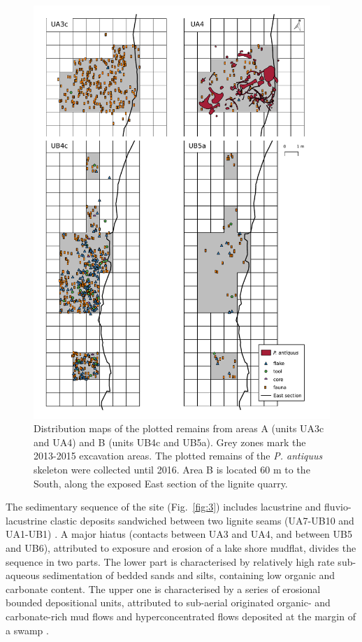 \documentclass[preprint,authoryear,times]{elsarticle} %
\begin{document}
\begin{figure}[]
  \centering
  \includegraphics[width=.9\textwidth]{./artwork/Fig2.pdf}
  \caption{Distribution maps of the plotted remains from areas A (units UA3c and UA4) and B (units UB4c and UB5a). Grey zones mark the 2013-2015 excavation areas. The plotted remains of the \emph{P. antiquus} skeleton were collected until 2016. Area B is located 60 m to the South, along the exposed East section of the lignite quarry.}
  \label{fig:2}
\end{figure}

The sedimentary sequence of the site (Fig.~\ref{fig:3}) includes lacustrine and fluvio-lacustrine clastic deposits sandwiched between two lignite seams (UA7-UB10 and UA1-UB1) \citep{Karkanas}. A major hiatus (contacts between UA3 and UA4, and between UB5 and UB6), attributed to exposure and erosion of a lake shore mudflat, divides the sequence in two parts. The lower part is characterised by relatively high rate sub-aqueous sedimentation of bedded sands and silts, containing low organic and carbonate content. The upper one is characterised by a series of erosional bounded depositional units, attributed to sub-aerial originated organic- and carbonate-rich mud flows and hyperconcentrated flows deposited at the margin of a swamp \citep{Karkanas}.
\end{document}
